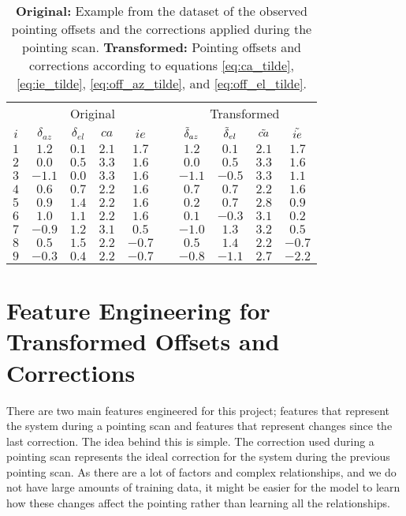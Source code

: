 \begin{table}[H]
    \centering
    \caption{\textbf{Original:} Example from the dataset of the observed pointing offsets and the corrections applied during the pointing scan.
    \textbf{Transformed:} Pointing offsets and corrections according to equations \eqref{eq:ca_tilde}, \eqref{eq:ie_tilde}, \eqref{eq:off_az_tilde}, and \eqref{eq:off_el_tilde}.}
    \label{tab:offset_and_corrections}
    \begin{tabular}{c cccc c cccc}
    \toprule
    \multicolumn{1}{c}{} & \multicolumn{4}{c}{Original} & \multicolumn{1}{c}{} & \multicolumn{4}{c}{Transformed} \\
    \cmidrule(lr){2-5} \cmidrule(lr){7-10} 
    $i$ &  $\delta_{az}$ &  $\delta_{el}$ &  $ca$ & $ie$  & & $\Tilde{\delta}_{az}$ &  $\Tilde{\delta}_{el}$ &  $\Tilde{ca}$ &  $\Tilde{ie}$ \\
    \midrule
    $1$ &     $1.2$ & $0.1$ & $2.1$ &  $1.7$ &   &    $1.2$ &       $0.1$ &       $2.1$ &       $1.7$ \\
    $2$ &     $0.0$ & $0.5$ & $3.3$ &  $1.6$ &   &    $0.0$ &       $0.5$ &       $3.3$ &       $1.6$ \\
    $3$ &    $-1.1$ & $0.0$ & $3.3$ &  $1.6$ &   &   $-1.1$ &      $-0.5$ &       $3.3$ &       $1.1$ \\
    $4$ &     $0.6$ & $0.7$ & $2.2$ &  $1.6$ &   &    $0.7$ &       $0.7$ &       $2.2$ &       $1.6$ \\
    $5$ &     $0.9$ & $1.4$ & $2.2$ &  $1.6$ &   &    $0.2$ &       $0.7$ &       $2.8$ &       $0.9$ \\
    $6$ &     $1.0$ & $1.1$ & $2.2$ &  $1.6$ &   &    $0.1$ &      $-0.3$ &       $3.1$ &       $0.2$ \\
    $7$ &    $-0.9$ & $1.2$ & $3.1$ &  $0.5$ &   &   $-1.0$ &       $1.3$ &       $3.2$ &       $0.5$ \\
    $8$ &     $0.5$ & $1.5$ & $2.2$ & $-0.7$ &   &    $0.5$ &       $1.4$ &       $2.2$ &      $-0.7$ \\
    $9$ &    $-0.3$ & $0.4$ & $2.2$ & $-0.7$ &   &   $-0.8$ &      $-1.1$ &       $2.7$ &      $-2.2$ \\
    \bottomrule
    \end{tabular}
\end{table}

\section{Feature Engineering for Transformed Offsets and Corrections}
There are two main features engineered for this project; features that represent the system during a pointing scan and features that represent changes since the last correction. 
The idea behind this is simple. The correction used during a pointing scan represents the ideal correction for the system during the previous pointing scan.
As there are a lot of factors and complex relationships, and we do not have large amounts of training data, it might be easier for the model to learn 
how these changes affect the pointing rather than learning all the relationships.

